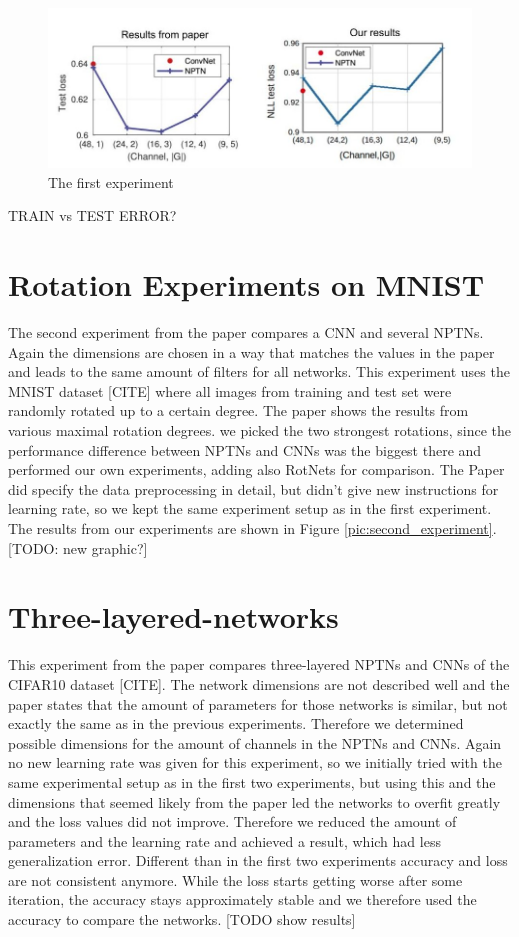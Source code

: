 \documentclass{llncs}
\begin{document}
\begin{figure}
	\begin{center}
	\includegraphics[scale=0.35]{result_images/experiment1.jpg}
	\caption{The first experiment}
	\label{pic:first_experiment}
	\end{center}
\end{figure}

TRAIN vs TEST ERROR?

\section{Rotation Experiments on MNIST}
The second experiment from the paper compares a CNN and several NPTNs. Again the dimensions are chosen in a way that matches the values in the paper and leads to the same amount of filters for all networks. 
This experiment uses the MNIST dataset [CITE] where all images from training and test set were randomly rotated up to a certain degree. 
The paper shows the results from various maximal rotation degrees. we picked the two strongest rotations, since the performance difference between NPTNs and CNNs was the biggest there and performed our own experiments, adding also RotNets for comparison.
The Paper did specify the data preprocessing in detail, but didn't give new instructions for learning rate, so we kept the same experiment setup as in the first experiment.
The results from our experiments are shown in Figure \ref{pic:second_experiment}. [TODO: new graphic?]


\section{Three-layered-networks}
This experiment from the paper compares three-layered NPTNs and CNNs of the CIFAR10 dataset [CITE]. 
The network dimensions are not described well and the paper states that the amount of parameters for those networks is similar, but not exactly the same as in the previous experiments. 
Therefore we determined possible dimensions for the amount of channels in the NPTNs and CNNs. 
Again no new learning rate was given for this experiment, so we initially tried with the same experimental setup as in the first two experiments, but using this and the dimensions that seemed likely from the paper led the networks to overfit greatly and the loss values did not improve. 
Therefore we reduced the amount of parameters and the learning rate and achieved a result, which had less generalization error. 
Different than in the first two experiments accuracy and loss are not consistent anymore. While the loss starts getting worse after some iteration, the accuracy stays approximately stable and we therefore used the accuracy to compare the networks.
[TODO show results]
\end{document}
